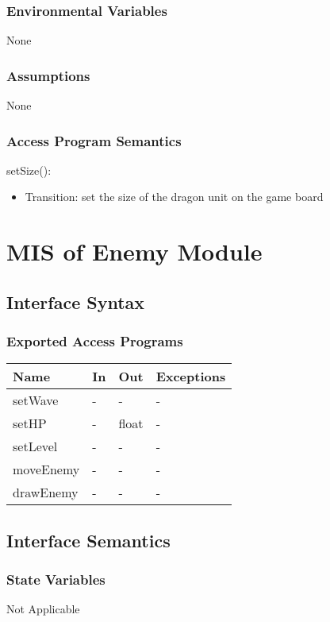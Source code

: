 \documentclass[12,english]{article}
\begin{document}
\subsubsection{Environmental Variables}
None
\subsubsection{Assumptions}
None
\subsubsection{Access Program Semantics}

\noindent setSize():
\begin{itemize}
    \item Transition: set the size of the dragon unit on the game board
\end{itemize}


\section{MIS of Enemy Module}
\subsection{Interface Syntax}
\subsubsection{Exported Access Programs}
\begin{table}[h!]
    \centering
    \begin{tabular}{|p{4cm}|p{2cm}|p{2cm}|p{2cm}|}
    \hline
    \textbf {Name}  & {In} & {Out} & {Exceptions} \\
    \hline
    setWave & - & - & -\\
    \hline
    setHP & - & float & -\\
    \hline
    setLevel & - & - & -\\
    \hline
    moveEnemy & - & - & -\\
    \hline
    drawEnemy & - & - & -\\
    \hline
    \end{tabular}
\end{table}
\subsection{Interface Semantics}
\subsubsection{State Variables}
Not Applicable 
\end{document}
